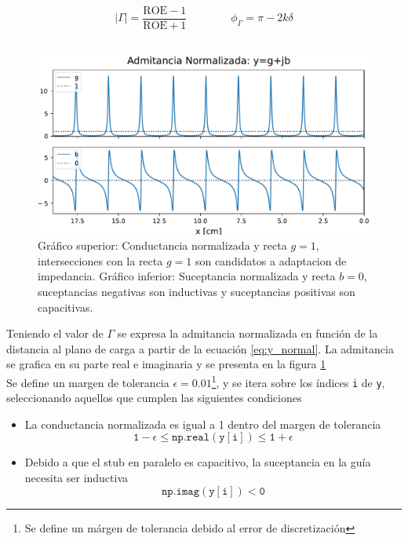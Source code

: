 \documentclass[11pt,a4paper]{article}
\begin{document}
\begin{appendices}
\begin{multicols}{2}
    \begin{equation*}
        \left|\Gamma\right| = \frac{\mathrm{ROE}-1}{\mathrm{ROE}+1}\qquad\qquad \phi_\Gamma = \pi-2k\delta
    \end{equation*}\\[-1em]

    \begin{figure}[H]
        \centering
        \includegraphics[width=\linewidth]{Images/ydex.pdf}
        \caption{Gráfico superior: Conductancia normalizada y recta $g=1$, intersecciones con la recta $g=1$ son candidatos a adaptacion de impedancia.
            Gráfico inferior: Suceptancia normalizada y recta $b=0$, suceptancias negativas son inductivas y suceptancias positivas son capacitivas.}
        \label{fig:ydex}
    \end{figure}
    Teniendo el valor de $\Gamma$ se expresa la admitancia normalizada en función de la distancia al plano de carga a partir de la ecuación \ref{eq:y_normal}. La admitancia se grafica en su parte real e imaginaria y se presenta en la figura \ref{fig:ydex}\\

    Se define un margen de tolerancia $\epsilon = 0.01$\footnote{Se define un márgen de tolerancia debido al error de discretización}, y se itera sobre los índices \texttt{i} de \texttt{y}, seleccionando aquellos que cumplen las siguientes condiciones

    \begin{itemize}
        \item La conductancia normalizada es igual a 1 dentro del margen de tolerancia
        $$\mathtt{ 1-\epsilon \le np.real(y[i]) \le  1+\epsilon}$$
        \item Debido a que el stub en paralelo es capacitivo, la suceptancia en la guía necesita ser inductiva
        $$\mathtt{np.imag(y[i])< 0}$$
    \end{itemize}


\end{multicols}
\end{appendices}
\end{document}
